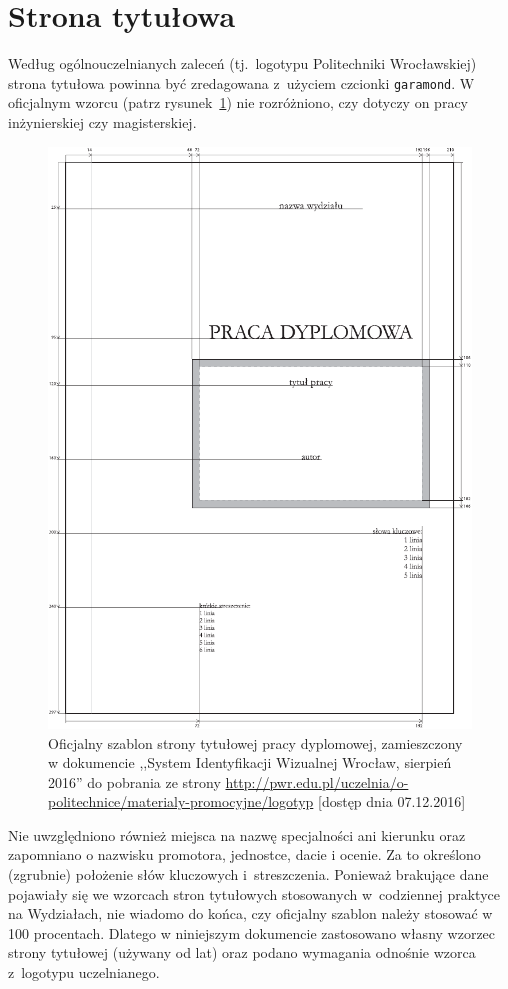 \section{Strona tytułowa}
Według ogólnouczelnianych zaleceń (tj.\ logotypu Politechniki Wrocławskiej) strona tytułowa powinna być zredagowana z~użyciem czcionki \texttt{garamond}. W oficjalnym wzorcu (patrz rysunek~\ref{fig:stronaTytulowa})
nie rozróżniono, czy dotyczy on pracy inżynierskiej czy magisterskiej. 
\begin{figure}[b]
	\centering
\includegraphics[width=.6\linewidth]{rys03/stronaTytulowa01}
	\caption{Oficjalny szablon strony tytułowej pracy dyplomowej, zamieszczony w dokumencie ,,System 
Identyfikacji Wizualnej Wrocław, sierpień 2016'' do pobrania ze strony \url{http://pwr.edu.pl/uczelnia/o-politechnice/materialy-promocyjne/logotyp} [dostęp dnia 07.12.2016]}
	\label{fig:stronaTytulowa}
\end{figure}
Nie uwzględniono również miejsca na nazwę specjalności ani kierunku oraz zapomniano o nazwisku promotora, jednostce, dacie i ocenie.  Za to określono (zgrubnie) położenie słów kluczowych i~streszczenia. Ponieważ brakujące dane pojawiały się we wzorcach stron tytułowych stosowanych w~codziennej praktyce na Wydziałach, nie wiadomo do końca, czy oficjalny szablon należy stosować w 100 procentach. Dlatego w niniejszym dokumencie zastosowano własny wzorzec strony tytułowej (używany od lat) oraz podano wymagania odnośnie wzorca z~logotypu uczelnianego.

